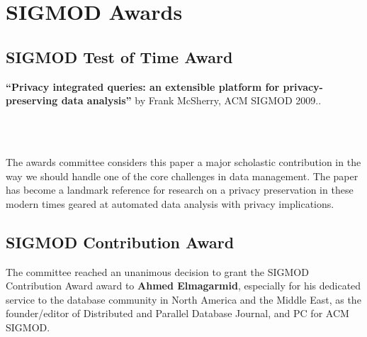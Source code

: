 
\newcommand{\personphoto}[1]{{\texttt{[image: \#1]}}}
\newcommand{\awardedpaper}[2]{ {\centering \textbf{``#1''}} by {\centering #2.}}
\newcommand{\quot}[2]{{\vspace{2mm}``\emph{#1}''}}


\clearpage


\ifodd\value{page}\hbox{}\newpage\fi



\section{SIGMOD Awards}

\subsection*{SIGMOD Test of Time Award}

\awardedpaper{Privacy integrated queries: an extensible platform for privacy-preserving data analysis}{Frank McSherry, ACM SIGMOD 2009}.

~\\~

The awards committee considers this paper a major scholastic contribution
in the way we should handle one of the core challenges in  data management. The paper
has become a landmark reference for research on a privacy preservation in these modern
times geared at automated data analysis with privacy implications.



\clearpage

\subsection*{SIGMOD Contribution Award}

The committee reached an unanimous decision to  grant the SIGMOD Contribution Award award to \textbf{Ahmed Elmagarmid}, especially for his dedicated service to the database community in North America and the Middle East, as the founder/editor of Distributed and Parallel Database Journal, and PC for ACM SIGMOD.


